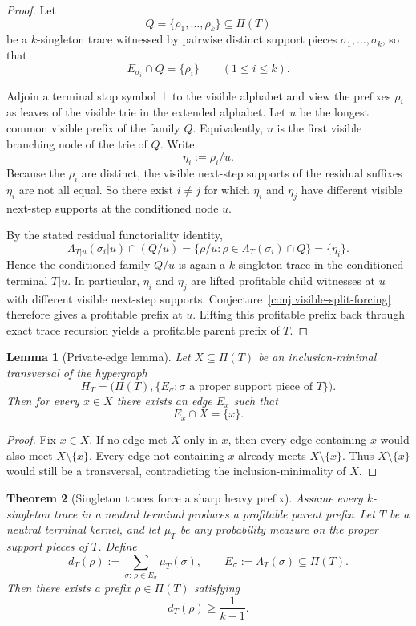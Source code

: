 \documentclass[11pt]{article}
\newtheorem{theorem}{Theorem}[section]
\newtheorem{lemma}[theorem]{Lemma}
\theoremstyle{definition}
\newcommand{\1}{\mathbf{1}}
\begin{document}
\begin{proof}
Let
\[
Q=\{\rho_1,\dots,\rho_k\}\subseteq \Pi(T)
\]
be a $k$-singleton trace witnessed by pairwise distinct support pieces $\sigma_1,\dots,\sigma_k$, so that
\[
E_{\sigma_i}\cap Q=\{\rho_i\}
\qquad (1\le i\le k).
\]

Adjoin a terminal stop symbol $\bot$ to the visible alphabet and view the prefixes $\rho_i$ as leaves of the visible trie in the extended alphabet.
Let $u$ be the longest common visible prefix of the family $Q$.
Equivalently, $u$ is the first visible branching node of the trie of $Q$.
Write
\[
\eta_i:=\rho_i/u.
\]
Because the $\rho_i$ are distinct, the visible next-step supports of the residual suffixes $\eta_i$ are not all equal.
So there exist $i\neq j$ for which $\eta_i$ and $\eta_j$ have different visible next-step supports at the conditioned node $u$.

By the stated residual functoriality identity,
\[
\Lambda_{T|u}(\sigma_i|u)\cap (Q/u)
=
\{\rho/u:\rho\in \Lambda_T(\sigma_i)\cap Q\}
=
\{\eta_i\}.
\]
Hence the conditioned family $Q/u$ is again a $k$-singleton trace in the conditioned terminal $T|u$.
In particular, $\eta_i$ and $\eta_j$ are lifted profitable child witnesses at $u$ with different visible next-step supports.
Conjecture~\ref{conj:visible-split-forcing} therefore gives a profitable prefix at $u$.
Lifting this profitable prefix back through exact trace recursion yields a profitable parent prefix of $T$.
\end{proof}

\begin{lemma}[Private-edge lemma]\label{lem:private-edge}
Let $X\subseteq \Pi(T)$ be an inclusion-minimal transversal of the hypergraph
\[
H_T=\bigl(\Pi(T),\{E_\sigma:\sigma\text{ a proper support piece of }T\}\bigr).
\]
Then for every $x\in X$ there exists an edge $E_x$ such that
\[
E_x\cap X=\{x\}.
\]
\end{lemma}

\begin{proof}
Fix $x\in X$.
If no edge met $X$ only in $x$, then every edge containing $x$ would also meet $X\setminus\{x\}$.
Every edge not containing $x$ already meets $X\setminus\{x\}$.
Thus $X\setminus\{x\}$ would still be a transversal, contradicting the inclusion-minimality of $X$.
\end{proof}

\begin{theorem}[Singleton traces force a sharp heavy prefix]\label{thm:singleton-heavy-prefix}
Assume every $k$-singleton trace in a neutral terminal produces a profitable parent prefix.
Let $T$ be a neutral terminal kernel, and let $\mu_T$ be any probability measure on the proper support pieces of $T$.
Define
\[
d_T(\rho):=\sum_{\sigma:\,\rho\in E_\sigma}\mu_T(\sigma),
\qquad
E_\sigma:=\Lambda_T(\sigma)\subseteq \Pi(T).
\]
Then there exists a prefix $\rho\in \Pi(T)$ satisfying
\[
d_T(\rho)\ge \frac{1}{k-1}.
\]
\end{theorem}
\end{document}
